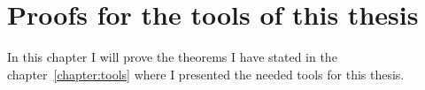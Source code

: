\chapter{Proofs for the tools of this thesis}

In this chapter I will prove the theorems I have stated in the chapter~\ref{chapter:tools} where I presented the needed tools for this thesis.
